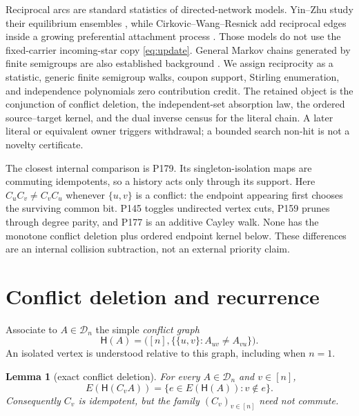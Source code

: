 \documentclass[a4paper,10pt]{amsart}
\newtheorem{lemma}[theorem]{Lemma}
\theoremstyle{remark}
\newcommand{\Dn}{\mathcal D_n}
\newcommand{\Conf}{\mathsf H}
\begin{document}
Reciprocal arcs are standard statistics of directed-network models.
Yin--Zhu study their equilibrium ensembles \cite{YinZhu2016}, while
Cirkovic--Wang--Resnick add reciprocal edges inside a growing preferential
attachment process \cite{CirkovicEtAl2023}.  Those models do not use the
fixed-carrier incoming-star copy \eqref{eq:update}.  General Markov chains
generated by finite semigroups are also established background
\cite{Brown2000}.  We assign reciprocity as a statistic, generic finite
semigroup walks, coupon support, Stirling enumeration, and independence
polynomials zero contribution credit.  The retained object is the conjunction
of conflict deletion, the independent-set absorption law, the ordered
source--target kernel, and the dual inverse census for the literal chain.
A later literal or equivalent owner triggers withdrawal; a bounded search
non-hit is not a novelty certificate.

The closest internal comparison is P179.  Its singleton-isolation maps are
commuting idempotents, so a history acts only through its support.  Here
$C_uC_v\ne C_vC_u$ whenever $\{u,v\}$ is a conflict: the endpoint appearing
first chooses the surviving common bit.  P145 toggles undirected vertex cuts,
P159 prunes through degree parity, and P177 is an additive Cayley walk.  None
has the monotone conflict deletion plus ordered endpoint kernel below.  These
differences are an internal collision subtraction, not an external priority
claim.

\section{Conflict deletion and recurrence}

Associate to $A\in\Dn$ the simple \emph{conflict graph}
\begin{equation}\label{eq:conflict}
 \Conf(A)=\bigl([n],\{\{u,v\}:A_{uv}\ne A_{vu}\}\bigr).
\end{equation}
An isolated vertex is understood relative to this graph, including when
$n=1$.

\begin{lemma}[exact conflict deletion]\label{lem:deletion}
For every $A\in\Dn$ and $v\in[n]$,
\begin{equation}\label{eq:deletion}
 E(\Conf(C_vA))=\{e\in E(\Conf(A)):v\notin e\}.
\end{equation}
Consequently $C_v$ is idempotent, but the family $(C_v)_{v\in[n]}$ need not
commute.
\end{lemma}
\end{document}
